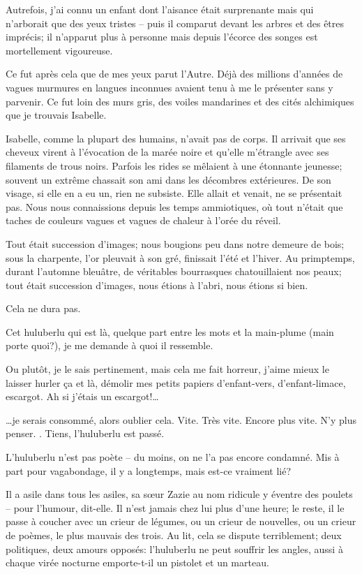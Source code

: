   Autrefois, j’ai  connu un enfant  dont l’aisance était  surprenante mais
  qui n’arborait que  des yeux tristes -- puis il  comparut devant les arbres
  et  des  êtres  imprécis;  il  n’apparut plus  à  personne  mais  depuis
  l’écorce des songes est mortellement vigoureuse.

  Ce  fut après  cela que  de mes  yeux parut  l’Autre. Déjà  des millions
  d’années de  vagues murmures en  langues inconnues  avaient tenu à  me le
  présenter sans y parvenir. Ce fut  loin des murs gris, des voiles mandarines
  et des cités alchimiques que je trouvais Isabelle.

  Isabelle, comme la  plupart des humains, n’avait pas de  corps. Il arrivait
  que ses  cheveux virent  à l’évocation  de la  marée noire  et qu’elle
  m’étrangle  avec  ses filaments  de  trous  noirs.  Parfois les  rides  se
  mêlaient à  une étonnante jeunesse;  souvent un extrême chassait  son ami
  dans les  décombres extérieures. De  son visage, si elle  en a eu  un, rien
  ne  subsiste.  Elle allait  et  venait,  ne  se  présentait pas.  Nous  nous
  connaissions depuis les temps ammiotiques,  où tout n’était que taches de
  couleurs vagues et vagues de chaleur à l’orée du réveil.

  Tout était  succession d’images; nous  bougions peu dans notre  demeure de
  bois; sous la charpente, l’or pleuvait  à son gré, finissait l’été et
  l’hiver.  Au  primptemps,  durant  l’automne  bleuâtre,  de  véritables
  bourrasques chatouillaient nos peaux; tout était succession d’images, nous
  étions à l’abri, nous étions si bien.

  Cela ne dura pas.

  Cet huluberlu qui est là, quelque part entre les mots et la main-plume (main
  porte quoi?), je me demande à quoi il ressemble.

  Ou plutôt, je le sais pertinement, mais cela me fait horreur, j’aime mieux
  le laisser  hurler ça et  là, démolir mes petits  papiers d’enfant-vers,
  d’enfant-limace, escargot. Ah si j’étais un escargot!…

  …je serais  consommé, alors  oublier cela. Vite.  Très vite.  Encore plus
  vite. N’y plus penser. . Tiens, l’huluberlu est passé.

  L’huluberlu  n’est  pas poète  --  du  moins,  on  ne l’a  pas  encore
  condamné.  Mis à  part  pour vagabondage,  il y  a  longtemps, mais  est-ce
  vraiment lié?

  Il a asile  dans tous les asiles,  sa sœur Zazie au nom  ridicule y éventre
  des poulets  -- pour l’humour,  dit-elle. Il  n’est jamais chez  lui plus
  d’une heure; le reste,  il le passe à coucher avec  un crieur de légumes,
  ou un  crieur de  nouvelles, ou  un crieur  de poèmes,  le plus  mauvais des
  trois. Au  lit, cela  se dispute terriblement;  deux politiques,  deux amours
  opposés: l’huluberlu ne  peut souffrir les angles, aussi  à chaque virée
  nocturne emporte-t-il un pistolet et un marteau.

